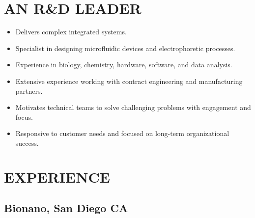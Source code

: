 \documentclass{res}
\begin{document}

\address{5210 Fiore Terrace L205 \\ San Diego, CA 92122 \\ (650) 391-8463}

\address{Citizenship: United States \\ \\ lewis.a.marshall@gmail.com}

\begin{resume}

\section{AN R\&D LEADER}
  \begin{itemize}
    \item Delivers complex integrated systems.
    \item Specialist in designing microfluidic devices and electrophoretic processes.
    \item Experience in biology, chemistry, hardware, software, and data analysis.
    \item Extensive experience working with contract engineering and manufacturing partners.
    \item Motivates technical teams to solve challenging problems with engagement and focus.
    \item Responsive to customer needs and focused on long-term organizational success.
  \end{itemize}



\section{EXPERIENCE}
\vspace{-0.1in}


   \subsection{Bionano, San Diego CA}
    \vspace{-0.2in}

\end{resume}
\end{document}
